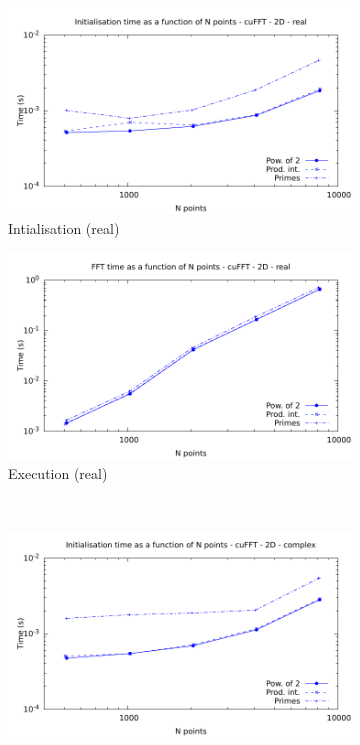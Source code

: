 \documentclass[12pt, a4paper]{article}
\begin{document}
\begin{figure}[H]
\captionsetup{width=0.8\linewidth}
\centering
\begin{subfigure}{.5\textwidth}
\centering
\includegraphics[width=.9\linewidth]{graphs/fft-cuda-2d-pow2-r-init.pdf}
\caption{Intialisation (real)}
\label{FFTCUDA1DRI}
\end{subfigure}%
\begin{subfigure}{.5\textwidth}
\centering
\includegraphics[width=.9\linewidth]{graphs/fft-cuda-2d-pow2-r-exec.pdf}
\caption{Execution (real)}
\label{FFTCUDA1DRE}
\end{subfigure}\\
\begin{subfigure}{.5\textwidth}
\centering
\includegraphics[width=.9\linewidth]{graphs/fft-cuda-2d-pow2-c-init.pdf}

\end{subfigure}
\end{figure}
\end{document}
